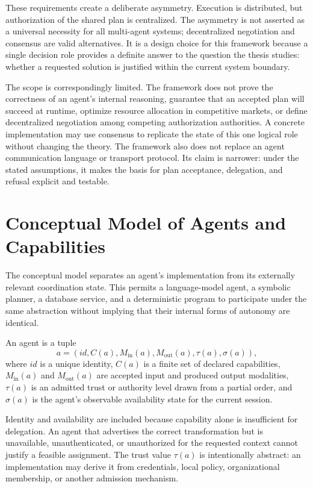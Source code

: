 These requirements create a deliberate asymmetry. Execution is distributed, but authorization of the shared plan is centralized. The asymmetry is not asserted as a universal necessity for all multi-agent systems; decentralized negotiation and consensus are valid alternatives. It is a design choice for this framework because a single decision role provides a definite answer to the question the thesis studies: whether a requested solution is justified within the current system boundary.

The scope is correspondingly limited. The framework does not prove the correctness of an agent's internal reasoning, guarantee that an accepted plan will succeed at runtime, optimize resource allocation in competitive markets, or define decentralized negotiation among competing authorization authorities. A concrete implementation may use consensus to replicate the state of this one logical role without changing the theory. The framework also does not replace an agent communication language or transport protocol. Its claim is narrower: under the stated assumptions, it makes the basis for plan acceptance, delegation, and refusal explicit and testable.

\section{Conceptual Model of Agents and Capabilities}

The conceptual model separates an agent's implementation from its externally relevant coordination state. This permits a language-model agent, a symbolic planner, a database service, and a deterministic program to participate under the same abstraction without implying that their internal forms of autonomy are identical.

\begin{definition}[Agent]
\label{def:agent}
An agent is a tuple
\[
a = (\mathit{id}, C(a), M_{\mathrm{in}}(a), M_{\mathrm{out}}(a), \tau(a), \sigma(a)),
\]
where $\mathit{id}$ is a unique identity, $C(a)$ is a finite set of declared capabilities, $M_{\mathrm{in}}(a)$ and $M_{\mathrm{out}}(a)$ are accepted input and produced output modalities, $\tau(a)$ is an admitted trust or authority level drawn from a partial order, and $\sigma(a)$ is the agent's observable availability state for the current session.
\end{definition}

Identity and availability are included because capability alone is insufficient for delegation. An agent that advertises the correct transformation but is unavailable, unauthenticated, or unauthorized for the requested context cannot justify a feasible assignment. The trust value $\tau(a)$ is intentionally abstract: an implementation may derive it from credentials, local policy, organizational membership, or another admission mechanism.

